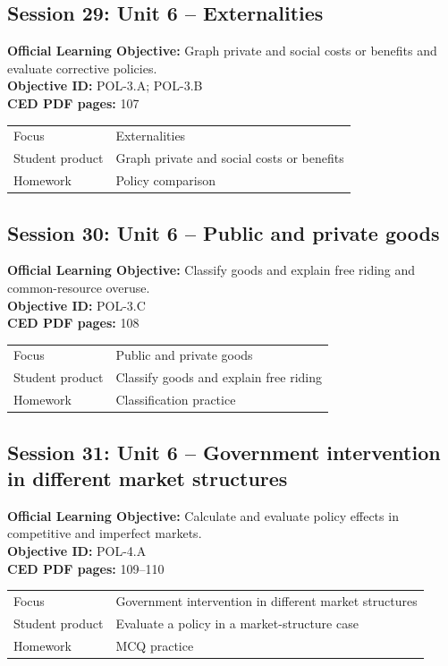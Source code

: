 \documentclass[11pt,a4paper]{article}
\newcommand{\objectivebox}[1]{\noindent\colorbox{aplight}{\parbox{0.96\textwidth}{#1}}}
\begin{document}
\subsection{Session 29: Unit 6 -- Externalities}
\objectivebox{\textbf{Official Learning Objective:} Graph private and social costs or benefits and evaluate corrective policies.\\\textbf{Objective ID:} POL-3.A; POL-3.B\\\textbf{CED PDF pages:} 107}\par\vspace{0.4em}
\begin{tabularx}{\textwidth}{p{3.0cm}Y}
\toprule
Focus & Externalities\\
Student product & Graph private and social costs or benefits\\
Homework & Policy comparison\\
\bottomrule
\end{tabularx}
\subsection{Session 30: Unit 6 -- Public and private goods}
\objectivebox{\textbf{Official Learning Objective:} Classify goods and explain free riding and common-resource overuse.\\\textbf{Objective ID:} POL-3.C\\\textbf{CED PDF pages:} 108}\par\vspace{0.4em}
\begin{tabularx}{\textwidth}{p{3.0cm}Y}
\toprule
Focus & Public and private goods\\
Student product & Classify goods and explain free riding\\
Homework & Classification practice\\
\bottomrule
\end{tabularx}
\newpage
\subsection{Session 31: Unit 6 -- Government intervention in different market structures}
\objectivebox{\textbf{Official Learning Objective:} Calculate and evaluate policy effects in competitive and imperfect markets.\\\textbf{Objective ID:} POL-4.A\\\textbf{CED PDF pages:} 109–110}\par\vspace{0.4em}
\begin{tabularx}{\textwidth}{p{3.0cm}Y}
\toprule
Focus & Government intervention in different market structures\\
Student product & Evaluate a policy in a market-structure case\\
Homework & MCQ practice\\
\bottomrule
\end{tabularx}
\end{document}

